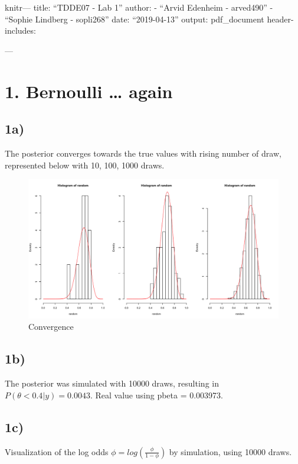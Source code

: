 \documentclass[]{article}
\title{}
\author{}
\date{}
\begin{document}
knitr--- title: ``TDDE07 - Lab 1'' author: - ``Arvid Edenheim -
arved490'' - ``Sophie Lindberg - sopli268'' date: ``2019-04-13'' output:
pdf\_document header-includes: \usepackage{float}
 ---

\newpage

\section{1. Bernoulli \ldots{} again}\label{bernoulli-again}

\subsection{1a)}\label{a}

The posterior converges towards the true values with rising number of
draw, represented below with 10, 100, 1000 draws.

\begin{figure}
\centering
\includegraphics{assets/lab_1_1_a.png}
\caption{Convergence}
\end{figure}

\subsection{1b)}\label{b}

The posterior was simulated with 10000 draws, resulting in
\(P(\theta < 0.4 | y) = 0.0043\). Real value using pbeta = 0.003973.

\newpage

\subsection{1c)}\label{c}

Visualization of the log odds \(\phi = log(\frac{\phi}{1-\phi})\) by
simulation, using 10000 draws.
\end{document}
